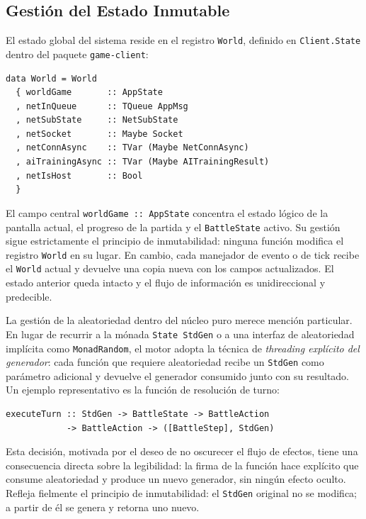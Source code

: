 \subsection{Gestión del Estado Inmutable}

El estado global del sistema reside en el registro \texttt{World}, definido en \texttt{Client.State} dentro del paquete \texttt{game-client}:

\begin{verbatim}
data World = World
  { worldGame       :: AppState
  , netInQueue      :: TQueue AppMsg
  , netSubState     :: NetSubState
  , netSocket       :: Maybe Socket
  , netConnAsync    :: TVar (Maybe NetConnAsync)
  , aiTrainingAsync :: TVar (Maybe AITrainingResult)
  , netIsHost       :: Bool
  }
\end{verbatim}

El campo central \texttt{worldGame :: AppState} concentra el estado lógico de la pantalla actual, el progreso de la partida y el \texttt{BattleState} activo. Su gestión sigue estrictamente el principio de inmutabilidad: ninguna función modifica el registro \texttt{World} en su lugar. En cambio, cada manejador de evento o de tick recibe el \texttt{World} actual y devuelve una copia nueva con los campos actualizados. El estado anterior queda intacto y el flujo de información es unidireccional y predecible.

\medskip

La gestión de la aleatoriedad dentro del núcleo puro merece mención particular. En lugar de recurrir a la mónada \texttt{State StdGen} o a una interfaz de aleatoriedad implícita como \texttt{MonadRandom}, el motor adopta la técnica de \textit{threading explícito del generador}: cada función que requiere aleatoriedad recibe un \texttt{StdGen} como parámetro adicional y devuelve el generador consumido junto con su resultado. Un ejemplo representativo es la función de resolución de turno:

\begin{verbatim}
executeTurn :: StdGen -> BattleState -> BattleAction
            -> BattleAction -> ([BattleStep], StdGen)
\end{verbatim}

Esta decisión, motivada por el deseo de no oscurecer el flujo de efectos, tiene una consecuencia directa sobre la legibilidad: la firma de la función hace explícito que consume aleatoriedad y produce un nuevo generador, sin ningún efecto oculto. Refleja fielmente el principio de inmutabilidad: el \texttt{StdGen} original no se modifica; a partir de él se genera y retorna uno nuevo.

